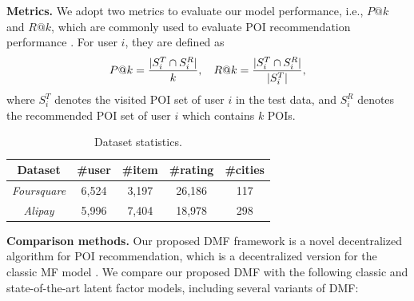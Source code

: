\textbf{Metrics.} 
We adopt two metrics to evaluate our model performance, i.e., $P@k$ and $R@k$, which are commonly used to evaluate POI recommendation performance \cite{cheng2012fused,gao2015content}. 
For user $i$, they are defined as
\begin{equation}\nonumber\small
	P@k=\frac{|S^T_i \cap S^R_i|}{k},~~~
	R@k=\frac{|S^T_i \cap S^R_i|}{|S^T_i|},
\end{equation} 
where $S^T_i$ denotes the visited POI set of user $i$ in the test data, and $S^R_i$ denotes the recommended POI set of user $i$ which contains $k$ POIs. 


\begin{table}
\centering
\caption{Dataset statistics.}
\label{dataset}
\begin{tabular}{|c|c|c|c|c|}
  \hline
  Dataset & \#user & \#item & \#rating & \#cities \\
  \hline
  \hline
  \emph{Foursquare} & 6,524 & 3,197 & 26,186 & 117 \\
  \hline
  \emph{Alipay} & 5,996 & 7,404 & 18,978 & 298 \\
  \hline
\end{tabular}
\end{table}

\textbf{Comparison methods.} 
Our proposed DMF framework is a novel decentralized algorithm for POI recommendation, which is a decentralized version for the classic MF model \cite{mnih2007probabilistic}. 
We compare our proposed DMF with the following classic and state-of-the-art latent factor models, including several variants of DMF:

